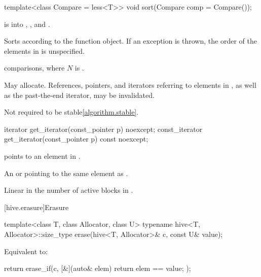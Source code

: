 %
\begin{itemdecl}
template<class Compare = less<T>>
  void sort(Compare comp = Compare());
\end{itemdecl}

\begin{itemdescr}
\pnum
\expects
{} is  into ,
, and .

\pnum
\effects
Sorts  according to the  function object.
If an exception is thrown,
the order of the elements in  is unspecified.

\pnum
\complexity
{} comparisons, where $N$ is .

\pnum
\remarks
May allocate.
References, pointers, and iterators referring to elements in ,
as well as the past-the-end iterator, may be invalidated.
\begin{note}
Not required to be stable\ref{algorithm.stable}.
\end{note}
\end{itemdescr}

%
\begin{itemdecl}
iterator get_iterator(const_pointer p) noexcept;
const_iterator get_iterator(const_pointer p) const noexcept;
\end{itemdecl}

\begin{itemdescr}
\pnum
\expects
{} points to an element in .

\pnum
\returns
An  or 
pointing to the same element as .

\pnum
\complexity
Linear in the number of active blocks in .
\end{itemdescr}

[hive.erasure]{Erasure}

%
\begin{itemdecl}
template<class T, class Allocator, class U>
  typename hive<T, Allocator>::size_type
    erase(hive<T, Allocator>& c, const U& value);
\end{itemdecl}

\begin{itemdescr}
\pnum
\effects
Equivalent to:
\begin{codeblock}
return erase_if(c, [&](auto& elem) { return elem == value; });
\end{codeblock}
\end{itemdescr}

